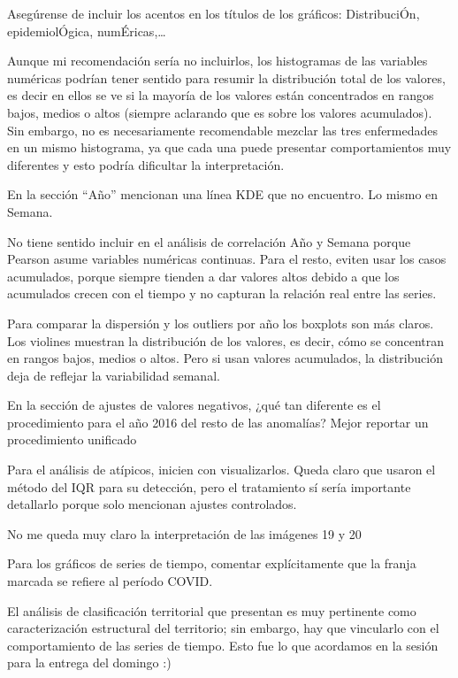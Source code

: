 \documentclass[12pt,a4paper]{article}
\begin{document}
Asegúrense de incluir los acentos en los títulos de los gráficos: DistribuciÓn, epidemiolÓgica, numÉricas,\ldots

Aunque mi recomendación sería no incluirlos, los histogramas de las variables numéricas podrían tener sentido para resumir la distribución total de los valores, es decir en ellos se ve si la mayoría de los valores están concentrados en rangos bajos, medios o altos (siempre aclarando que es sobre los valores acumulados). Sin embargo, no es necesariamente recomendable mezclar las tres enfermedades en un mismo histograma, ya que cada una puede presentar comportamientos muy diferentes y esto podría dificultar la interpretación.

En la sección ``Año'' mencionan una línea KDE que no encuentro. Lo mismo en Semana.

No tiene sentido incluir en el análisis de correlación Año y Semana porque Pearson asume variables numéricas continuas. Para el resto, eviten usar los casos acumulados, porque siempre tienden a dar valores altos debido a que los acumulados crecen con el tiempo y no capturan la relación real entre las series.

Para comparar la dispersión y los outliers por año los boxplots son más claros. Los violines muestran la distribución de los valores, es decir, cómo se concentran en rangos bajos, medios o altos. Pero si usan valores acumulados, la distribución deja de reflejar la variabilidad semanal.

En la sección de ajustes de valores negativos, ¿qué tan diferente es el procedimiento para el año 2016 del resto de las anomalías? Mejor reportar un procedimiento unificado

Para el análisis de atípicos, inicien con visualizarlos. Queda claro que usaron el método del IQR para su detección, pero el tratamiento sí sería importante detallarlo porque solo mencionan ajustes controlados.

No me queda muy claro la interpretación de las imágenes 19 y 20

Para los gráficos de series de tiempo, comentar explícitamente que la franja marcada se refiere al período COVID.

El análisis de clasificación territorial que presentan es muy pertinente como caracterización estructural del territorio; sin embargo, hay que vincularlo con el comportamiento de las series de tiempo. Esto fue lo que acordamos en la sesión para la entrega del domingo :)
\end{document}
